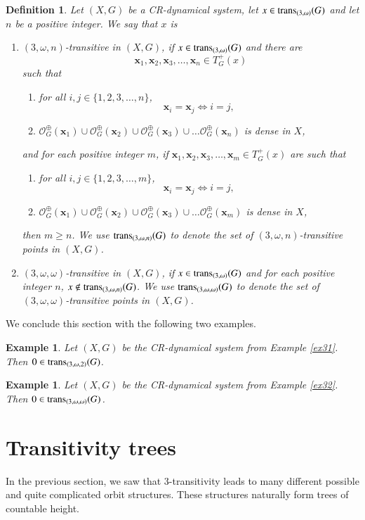 \documentclass[a4paper,12pt]{article} %
\newcommand{\orbit}{\mathcal{O}^{\oplus}}
\newcommand{\tplus}{T^{+}}
\newcommand{\trans}{\textup{trans}}
\newtheorem{definition}[theorem]{Definition}
\newtheorem{example}[theorem]{Example}
\begin{document}
\begin{definition}
Let $(X,G)$ be a CR-dynamical system, let $x\in \trans_{(3,\omega)}(G)$ and let $n$ be a positive integer. We say that $x$ is
\begin{enumerate}
\item \emph{\color{blue} $(3,\omega,n)$-transitive in $(X,G)$}, if $x\in \trans_{(3,\omega)}(G)$ and there are 
$$
\mathbf x_1,\mathbf x_2,\mathbf x_3,\ldots ,\mathbf x_n\in \tplus_G(x)
$$
 such that
\begin{enumerate}
\item for all $i,j\in \{1,2,3,\ldots, n\}$, 
$$
\mathbf x_i=\mathbf x_j \Longleftrightarrow i=j,
$$
\item $\orbit_G(\mathbf x_1)\cup\orbit_G(\mathbf x_2)\cup\orbit_G(\mathbf x_3)\cup\ldots \orbit_G(\mathbf x_n)$ is dense in $X$,
\end{enumerate}
and for each positive integer $m$, if   $\mathbf x_1,\mathbf x_2,\mathbf x_3,\ldots ,\mathbf x_m\in \tplus_G(x)$ are such that
\begin{enumerate}
\item for all $i,j\in \{1,2,3,\ldots, m\}$, 
$$
\mathbf x_i=\mathbf x_j \Longleftrightarrow i=j,
$$
\item $\orbit_G(\mathbf x_1)\cup\orbit_G(\mathbf x_2)\cup\orbit_G(\mathbf x_3)\cup\ldots \orbit_G(\mathbf x_m)$ is dense in $X$,
\end{enumerate}
then $m\geq n$.
  We use \emph{\color{blue}  $\trans_{(3,\omega,n)}(G)$} to denote the set of  $(3,\omega,n)$-transitive points in $(X,G)$.
  \item \emph{\color{blue} $(3,\omega,\omega)$-transitive in $(X,G)$}, if $x\in \trans_{(3,\omega)}(G)$ and for each positive integer $n$, $x\not \in \trans_{(3,\omega ,n)}(G)$. 
  We use \emph{\color{blue}  $\trans_{(3,\omega,\omega)}(G)$} to denote the set of  $(3,\omega,\omega)$-transitive points in $(X,G)$.
\end{enumerate}
\end{definition}
We conclude this section with the following two examples.
\begin{example}\label{ex31aa}
Let $(X,G)$ be the CR-dynamical system from Example \ref{ex31}.
Then $0\in \trans_{(3,\omega,2)}(G)$.
\end{example}
\begin{example}\label{ex32aa}
Let $(X,G)$ be the CR-dynamical system from Example \ref{ex32}.
Then $0\in \trans_{(3,\omega,\omega)}(G)$.
\end{example}
\section{Transitivity trees}  \label{s3}
In the previous section, we saw that 3-transitivity leads to many different possible and quite complicated orbit structures.  These structures naturally form trees of countable height.  
\end{document}
